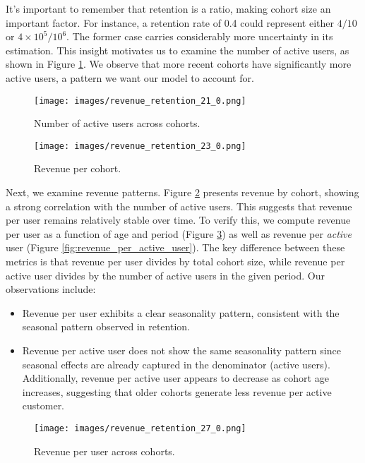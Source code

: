 \documentclass[11pt]{amsart}
\theoremstyle{definition}
\begin{document}
It's important to remember that retention is a ratio, making cohort size an important factor. For instance, a retention rate
of 0.4 could represent either $4/10$ or $4\times 10^{5} / 10^{6}$. The former case carries considerably more uncertainty in
its estimation. This insight motivates us to examine the number of active users, as shown in Figure \ref{fig:active_users}.
We observe that more recent cohorts have significantly more active users, a pattern we want our model to account for. \\

\begin{figure}
    \centering
    \texttt{[image: images/revenue\_retention\_21\_0.png]}
    \caption{Number of active users across cohorts.}
    \label{fig:active_users}
\end{figure}

\begin{figure}
    \centering
    \texttt{[image: images/revenue\_retention\_23\_0.png]}
    \caption{Revenue per cohort.}
    \label{fig:revenue}
\end{figure}

Next, we examine revenue patterns. Figure \ref{fig:revenue} presents revenue by cohort, showing a strong correlation with the
number of active users. This suggests that revenue per user remains relatively stable over time. To verify this, we compute
revenue per user as a function of age and period (Figure \ref{fig:revenue_per_user}) as well as revenue per {\em active} user
(Figure \ref{fig:revenue_per_active_user}). The key difference between these metrics is that revenue per user divides by
total cohort size, while revenue per active user divides by the number of active users in the given period. Our observations
include:

\begin{itemize}
    \item Revenue per user exhibits a clear seasonality pattern, consistent with the seasonal pattern observed in retention.
    \item Revenue per active user does not show the same seasonality pattern since seasonal effects are already captured in
          the denominator (active users). Additionally, revenue per active user appears to decrease as cohort age increases,
          suggesting that older cohorts generate less revenue per active customer.
\end{itemize}

\begin{figure}
    \centering
    \texttt{[image: images/revenue\_retention\_27\_0.png]}
    \caption{Revenue per user across cohorts.}
    \label{fig:revenue_per_user}
\end{figure}
\end{document}

